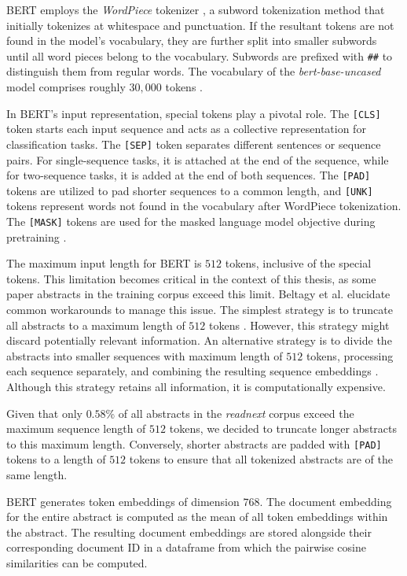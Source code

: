 BERT employs the \emph{WordPiece} tokenizer \cite{WuGoogleNeural2016}, a subword tokenization method that initially tokenizes at whitespace and punctuation. If the resultant tokens are not found in the model's vocabulary, they are further split into smaller subwords until all word pieces belong to the vocabulary. Subwords are prefixed with \texttt{\#\#} to distinguish them from regular words. The vocabulary of the \emph{bert-base-uncased} model comprises roughly $30,000$ tokens \cite{DevlinBERTPretraining2019}.

In BERT's input representation, special tokens play a pivotal role. The \texttt{[CLS]} token starts each input sequence and acts as a collective representation for classification tasks. The \texttt{[SEP]} token separates different sentences or sequence pairs. For single-sequence tasks, it is attached at the end of the sequence, while for two-sequence tasks, it is added at the end of both sequences. The \texttt{[PAD]} tokens are utilized to pad shorter sequences to a common length, and \texttt{[UNK]} tokens represent words not found in the vocabulary after WordPiece tokenization. The \texttt{[MASK]} tokens are used for the masked language model objective during pretraining \cite{DevlinBERTPretraining2019}.

The maximum input length for BERT is $512$ tokens, inclusive of the special tokens. This limitation becomes critical in the context of this thesis, as some paper abstracts in the training corpus exceed this limit. Beltagy et al. \cite{BeltagyLongformerLongDocument2020} elucidate common workarounds to manage this issue. The simplest strategy is to truncate all abstracts to a maximum length of $512$ tokens \cite{XieUnsupervisedData2020}. However, this strategy might discard potentially relevant information. An alternative strategy is to divide the abstracts into smaller sequences with maximum length of $512$ tokens, processing each sequence separately, and combining the resulting sequence embeddings \cite{JoshiBERTCoreference2019}. Although this strategy retains all information, it is computationally expensive.

Given that only $0.58$\% of all abstracts in the \emph{readnext} corpus exceed the maximum sequence length of $512$ tokens, we decided to truncate longer abstracts to this maximum length. Conversely, shorter abstracts are padded with \texttt{[PAD]} tokens to a length of $512$ tokens to ensure that all tokenized abstracts are of the same length.

BERT generates token embeddings of dimension $768$. The document embedding for the entire abstract is computed as the mean of all token embeddings within the abstract. The resulting document embeddings are stored alongside their corresponding document ID in a dataframe from which the pairwise cosine similarities can be computed.


